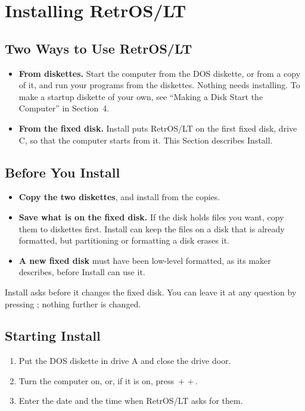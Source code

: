 \mwnewpart
\renewcommand\runningtitle{Section 2. Installing RetrOS/LT}
\chapter{Installing RetrOS/LT}
\sectioncontents

\section{Two Ways to Use RetrOS/LT}

\begin{itemize}
\item \textbf{From diskettes.} Start the computer from the DOS diskette, or
  from a copy of it, and run your programs from the diskettes. Nothing
  needs installing. To make a startup diskette of your own, see ``Making a
  Disk Start the Computer'' in Section~4.
\item \textbf{From the fixed disk.} Install puts RetrOS/LT on the first
  fixed disk, drive C, so that the computer starts from it. This Section
  describes Install.
\end{itemize}

\section{Before You Install}

\begin{itemize}
\item \textbf{Copy the two diskettes}, and install from the copies.
\item \textbf{Save what is on the fixed disk.} If the disk holds files you
  want, copy them to diskettes first. Install can keep the files on a disk
  that is already formatted, but partitioning or formatting a disk erases
  it.
\item \textbf{A new fixed disk} must have been low-level formatted, as its
  maker describes, before Install can use it.
\end{itemize}

Install asks before it changes the fixed disk. You can leave it at any
question by pressing ; nothing further is changed.

\section{Starting Install}

\begin{enumerate}
\item Put the DOS diskette in drive A and close the drive door.
\item Turn the computer on, or, if it is on, press
  \,+\,\,+\,.
\item Enter the date and the time when RetrOS/LT asks for them.
\end{enumerate}

